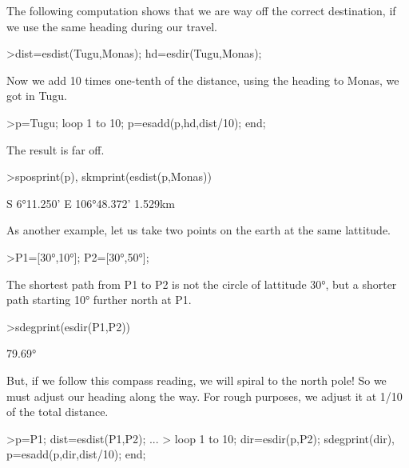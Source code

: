 \documentclass[a4paper,10pt]{article}
\begin{document}
\begin{eulernotebook}
\begin{eulercomment}
\begin{eulercomment}
\begin{eulercomment}
\begin{eulercomment}
\begin{eulercomment}
\begin{eulercomment}
\begin{eulercomment}
The following computation shows that we are way off the correct
destination, if we use the same heading during our travel.
\end{eulercomment}
\begin{eulerprompt}
>dist=esdist(Tugu,Monas); hd=esdir(Tugu,Monas);
\end{eulerprompt}
\begin{eulercomment}
Now we add 10 times one-tenth of the distance, using the heading to Monas, we got in Tugu.
\end{eulercomment}
\begin{eulerprompt}
>p=Tugu; loop 1 to 10; p=esadd(p,hd,dist/10); end;
\end{eulerprompt}
\begin{eulercomment}
The result is far off.
\end{eulercomment}
\begin{eulerprompt}
>sposprint(p), skmprint(esdist(p,Monas))
\end{eulerprompt}
\begin{euleroutput}
  S 6°11.250' E 106°48.372'
       1.529km
\end{euleroutput}
\begin{eulercomment}
As another example, let us take two points on the earth at the same
lattitude.
\end{eulercomment}
\begin{eulerprompt}
>P1=[30°,10°]; P2=[30°,50°];
\end{eulerprompt}
\begin{eulercomment}
The shortest path from P1 to P2 is not the circle of lattitude 30°,
but a shorter path starting 10° further north at P1.
\end{eulercomment}
\begin{eulerprompt}
>sdegprint(esdir(P1,P2))
\end{eulerprompt}
\begin{euleroutput}
       79.69°
\end{euleroutput}
\begin{eulercomment}
But, if we follow this compass reading, we will spiral to the north
pole! So we must adjust our heading along the way. For rough purposes,
we adjust it at 1/10 of the total distance.
\end{eulercomment}
\begin{eulerprompt}
>p=P1;  dist=esdist(P1,P2); ...
>  loop 1 to 10; dir=esdir(p,P2); sdegprint(dir), p=esadd(p,dir,dist/10); end;
\end{eulerprompt}
\begin{euleroutput}

\end{euleroutput}
\end{eulercomment}
\end{eulercomment}
\end{eulercomment}
\end{eulercomment}
\end{eulercomment}
\end{eulercomment}
\end{eulernotebook}
\end{document}
